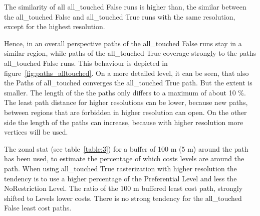 \documentclass[acmtog]{acmart}
\begin{document}
	The similarity of all all\_touched False runs is higher than, the similar between the all\_touched False and all\_touched True runs with the same resolution, except for the highest resolution.
	
	Hence, in an overall perspective paths of the all\_touched False runs stay in a
	similar region, while paths of the all\_touched True coverage strongly to the paths all\_touched False runs.
	This behaviour is depicted in figure~\ref{fig:paths_alltouched}.
	On a more detailed level, it can be seen, that also the Paths of all\_touched 	converges the all\_touched True path.
	But the extent is smaller.
	The length of the the paths only differs to a maximum of about 10 \%.
	The least path distance for higher resolutions can be lower, because new paths, between regions that are forbidden
	in higher resolution can open.
	On the other side the length of the paths can increase, because with higher resolution more vertices will be used.
	
	The zonal stat (see table~\ref{table:3}) for a buffer of 100 m (5 m) around the path has been used, to estimate the
	percentage of which costs levels are around the path.
	When using all\_touched True rasterization with higher resolution the tendency is to use a higher percentage of the
	Preferential Level and less the NoRestriction Level.
	The ratio of the 100 m buffered least cost path, strongly shifted  to Levels lower costs.
	There is no strong tendency for the all\_touched False least cost paths.
	
	
	
	
	\setlength{\tabcolsep}{10pt}
	
\end{document}

